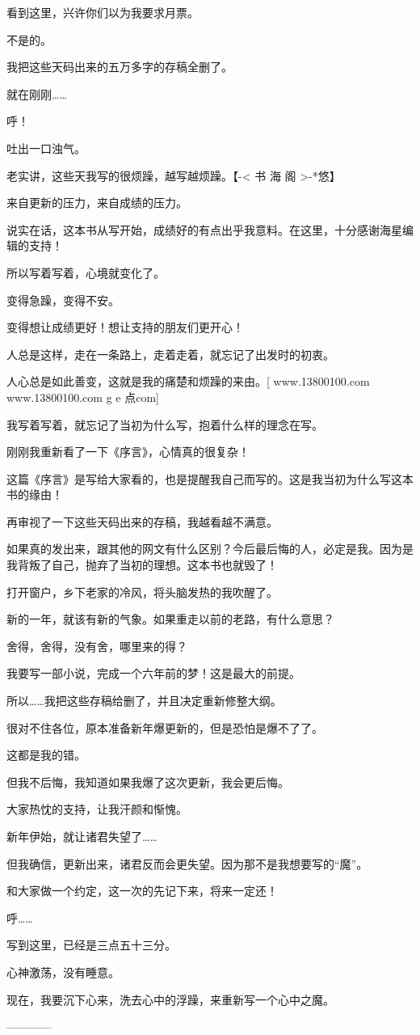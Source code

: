 \begin{this_body}
看到这里，兴许你们以为我要求月票。

不是的。

我把这些天码出来的五万多字的存稿全删了。

就在刚刚……

呼！

吐出一口浊气。

老实讲，这些天我写的很烦躁，越写越烦躁。【-< 书 海 阁 >-*悠】

来自更新的压力，来自成绩的压力。

说实在话，这本书从写开始，成绩好的有点出乎我意料。在这里，十分感谢海星编辑的支持！

所以写着写着，心境就变化了。

变得急躁，变得不安。

变得想让成绩更好！想让支持的朋友们更开心！

人总是这样，走在一条路上，走着走着，就忘记了出发时的初衷。

人心总是如此善变，这就是我的痛楚和烦躁的来由。[ www.13800100.com www.13800100.com g e 点com]

我写着写着，就忘记了当初为什么写，抱着什么样的理念在写。

刚刚我重新看了一下《序言》，心情真的很复杂！

这篇《序言》是写给大家看的，也是提醒我自己而写的。这是我当初为什么写这本书的缘由！

再审视了一下这些天码出来的存稿，我越看越不满意。

如果真的发出来，跟其他的网文有什么区别？今后最后悔的人，必定是我。因为是我背叛了自己，抛弃了当初的理想。这本书也就毁了！

打开窗户，乡下老家的冷风，将头脑发热的我吹醒了。

新的一年，就该有新的气象。如果重走以前的老路，有什么意思？

舍得，舍得，没有舍，哪里来的得？

我要写一部小说，完成一个六年前的梦！这是最大的前提。

所以……我把这些存稿给删了，并且决定重新修整大纲。

很对不住各位，原本准备新年爆更新的，但是恐怕是爆不了了。

这都是我的错。

但我不后悔，我知道如果我爆了这次更新，我会更后悔。

大家热忱的支持，让我汗颜和惭愧。

新年伊始，就让诸君失望了……

但我确信，更新出来，诸君反而会更失望。因为那不是我想要写的“魔”。

和大家做一个约定，这一次的先记下来，将来一定还！

呼……

写到这里，已经是三点五十三分。

心神激荡，没有睡意。

现在，我要沉下心来，洗去心中的浮躁，来重新写一个心中之魔。

------------

\end{this_body}

